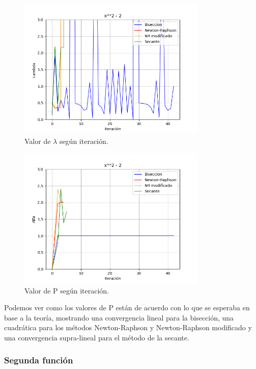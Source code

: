 \documentclass[titlepage,a4paper]{article}
\begin{document}
\begin{figure}[H]
    \centering
    \includegraphics[width=0.8\textwidth]{lambda f1.png}
    \caption{\label{fig:class01}Valor de $\lambda$ según iteración.}
\end{figure}
\begin{figure}[H]
    \centering
    \includegraphics[width=0.8\textwidth]{alfa f1.png}
    \caption{\label{fig:class01}Valor de P según iteración.}
\end{figure}

Podemos ver como los valores de P están de acuerdo con lo que se esperaba en base a la teoría, mostrando una convergencia lineal para la bisección, una cuadrática para los métodos Newton-Raphson y Newton-Raphson modificado y una convergencia supra-lineal para el método de la secante.

\subsubsection{Segunda función}\label{sec:CR2}
\end{document}
